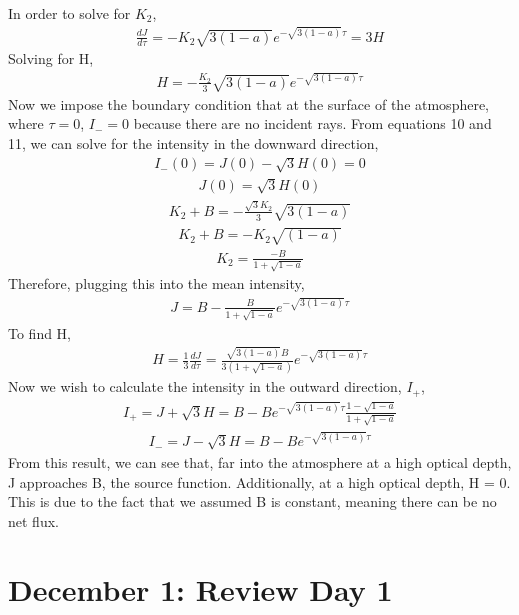 \documentclass{article}
\begin{document}
In order to solve for $K_2$, 
\begin{align}
\frac{dJ}{d \tau} = -K_2 \sqrt{3(1-a)}e^{-\sqrt{3(1-a)}\tau} = 3H
\end{align}
Solving for H,
\begin{align}
H = -\frac{K_2}{3} \sqrt{3(1-a)}e^{-\sqrt{3(1-a)}\tau}
\end{align}
Now we impose the boundary condition that at the surface of the atmosphere, where $\tau = 0$, $I_{-} = 0$ because there are no incident rays. From equations 10 and 11, we can solve for the intensity in the downward direction,
\begin{align}
I_{-}(0) = J(0) - \sqrt{3} H(0) = 0 
\end{align}
\begin{align}
J(0) = \sqrt{3}H(0)
\end{align}
\begin{align}
K_2 + B = -\frac{\sqrt{3}K_2}{3} \sqrt{3(1-a)}
\end{align}
\begin{align}
K_2 + B = -K_2 \sqrt{(1-a)}
\end{align}
\begin{align}
K_{2} = \frac{-B}{1 + \sqrt{1-a}}
\end{align}
Therefore, plugging this into the mean intensity,
\begin{align}
J = B - \frac{B}{1 + \sqrt{1-a}}e^{-\sqrt{3(1-a)}\tau}
\end{align}
To find H,
\begin{align}
H = \frac{1}{3}\frac{dJ}{d \tau} = \frac{\sqrt{3(1-a)}B}{3(1 + \sqrt{1-a})} e^{-\sqrt{3(1-a)}\tau}
\end{align}
Now we wish to calculate the intensity in the outward direction, $I_{+}$, 
\begin{align}
I_+ =  J + \sqrt{3}H= B - Be^{-\sqrt{3(1-a)}\tau}\frac{1-\sqrt{1-a}}{1 + \sqrt{1-a}}
\end{align}
\begin{align}
I_- = J - \sqrt{3}H = B - Be^{-\sqrt{3(1-a)}\tau}
\end{align}
From this result, we can see that, far into the atmosphere at a high optical depth, J approaches B, the source function. Additionally, at a high optical depth, H = 0. This is due to the fact that we assumed B is constant, meaning there can be no net flux.


\section{December 1: Review Day 1}
\end{document}
